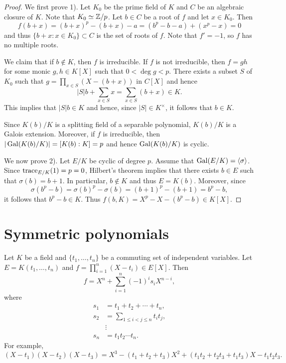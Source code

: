 \begin{proof}
    We first prove 1). 
    Let $K_0$ be the prime field of $K$ and $C$ be an algebraic closure of $K$. Note that $K_0\simeq\mathbb{Z}/p$. 
    Let $b\in C$ be a root of $f$ and let $x\in K_0$. 
    Then
    \[
    f(b+x)=(b+x)^p-(b+x)-a
    =(b^p-b-a)+(x^p-x)=0
    \]
    and thus $\{b+x:x\in K_0\}\subset C$ is the set of roots of $f$. Note that 
    $f'=-1$, so $f$ has no multiple roots. 
    
    We claim that if $b\not\in K$, then $f$ is irreducible. If 
    $f$ is not irreducible, then 
    $f=gh$ for some monic $g,h\in K[X]$ such that $0<\deg g<p$. There exists
    a subset $S$ of $K_0$ such that 
    $g=\prod_{x\in S}(X-(b+x))$ in $C[X]$ and hence
    \[
    |S|b+\sum_{x\in S}x=\sum_{x\in S}(b+x)\in K.
    \]
    This implies that $|S|b\in K$ and hence, since 
    $|S|\in K^{\times}$, it follows that 
    $b\in K$.
    
    Since $K(b)/K$ is a splitting field of a separable polynomial, 
    $K(b)/K$ is a Galois extension. Moreover, 
    if $f$ is irreducible, then
    $|\operatorname{Gal}(K(b)/K)|=[K(b):K]=p$ and hence 
    $\operatorname{Gal}(K(b)/K)$ is cyclic. 
    
    We now prove 2). Let $E/K$ be cyclic of degree $p$. Assume
    that $\operatorname{Gal}(E/K)=\langle\sigma\rangle$. Since
    $\operatorname{trace}_{E/K}(1)=p=0$, Hilbert's theorem 
    implies that there exists $b\in E$ such that 
    $\sigma(b)=b+1$. In particular, $b\not\in K$
    and thus $E=K(b)$. Moreover, since 
    \[
    \sigma(b^p-b)=\sigma(b)^p-\sigma(b)=(b+1)^p-(b+1)=b^p-b, 
    \]
    it follows that $b^p-b\in K$. Thus 
    $f(b,K)=X^p-X-(b^p-b)\in K[X]$. 
\end{proof}

\section{Symmetric polynomials}

Let $K$ be a field and $\{t_1,\dots,t_n\}$ be a commuting set of  independent variables.  
Let $E=K(t_1,\dots,t_n)$ and $f=\prod_{i=1}^n(X-t_i)\in E[X]$. 
Then
\[
f=X^n+\sum_{i=1}^n (-1)^i s_i X^{n-i},
\]
where 
\begin{align*}
    s_1 &= t_1+t_2+\cdots+t_n,\\
    s_2 &= \sum_{1\leq i<j\leq n}t_it_j,\\
    &\vdots\\
    s_n &= t_1t_2\cdots t_n.
\end{align*}
For example, 
\[
(X-t_1)(X-t_2)(X-t_3)=X^3-(t_1+t_2+t_3)X^2+(t_1t_2+t_2t_3+t_1t_3)X-t_1t_2t_3.
\]

